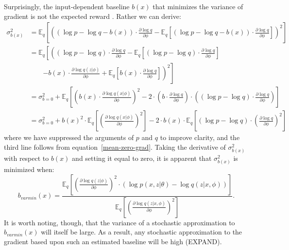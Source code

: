 \documentclass{article} %
\begin{document}
Surprisingly, the input-dependent baseline $b(x)$ that minimizes the variance of gradient is not the expected reward \cite{weaver2001optimal, greensmith2004variance}.  Rather we can derive:
\begin{align*}
\sigma_{b(x)}^2 &= \mathbb{E}_q \left[ \left( \left( \log p - \log q - b(x) \right) \cdot \frac{\partial \log q}{\partial \phi}  %
- \mathbb{E}_q \left[ \left( \log p - \log q - b(x) \right) \cdot \frac{\partial \log q}{\partial \phi} \right] \right)^2
\right] \\
&= \mathbb{E}_q \left[ \left( \left( \log p - \log q \right) \cdot \frac{\partial \log q}{\partial \phi}  
- \mathbb{E}_q \left[ \left( \log p - \log q \right) \cdot \frac{\partial \log q}{\partial \phi}  \right] \right. \right. \\
&\qquad \left. \left. - b(x) \cdot \frac{\partial \log q(z| \phi)}{\partial \phi} + \mathbb{E}_q \left[ b(x) \cdot \frac{\partial \log q}{\partial \phi} \right] \right)^2 \right] \\
&= \sigma_{b = 0}^2 + \mathbb{E}_q \left[ \left( b(x) \cdot \frac{\partial \log q(x|\phi) }{ \partial \phi } \right)^2
- 2 \cdot \left(b \cdot \frac{ \partial \log q}{ \partial \phi } \right) \cdot \left( \left( \log p - \log q \right) \cdot \frac{\partial \log q}{\partial \phi} \right) \right] \\
&= \sigma_{b = 0}^2 + b(x)^2 \cdot \mathbb{E}_q \left[ \left( \frac{\partial \log q(x|\phi) }{ \partial \phi } \right)^2 \right]
- 2 \cdot b(x) \cdot  \mathbb{E}_q \left[ \left( \log p - \log q \right) \cdot \left( \frac{\partial \log q}{\partial \phi} \right)^2 \right]
\end{align*}
where we have suppressed the arguments of $p$ and $q$ to improve clarity, and the third line follows from equation~\ref{mean-zero-grad}.  Taking the derivative of $\sigma_{b(x)}^2$ with respect to $b(x)$ and setting it equal to zero, it is apparent that $\sigma_{b(x)}^2$ is minimized when:
\begin{equation} \label{minimal-variance-baseline}
b_{varmin}(x) = \frac{\mathbb{E}_q \left[ \left( \frac{ \partial \log q(z|\phi)}{\partial \phi} \right)^2 \cdot \left( \log p(x,z | \theta) - \log q(z | x, \phi) \right) \right]}
{ \mathbb{E}_q \left[ \left( \frac{ \partial \log q(z | x, \phi) }{\partial \phi} \right)^2 \right] } .
\end{equation}
It is worth noting, though, that the variance of a stochastic approximation to $b_{varmin}(x)$ will itself be large.  As a result, any stochastic approximation to the gradient based upon such an estimated baseline will be high (EXPAND).
\end{document}
